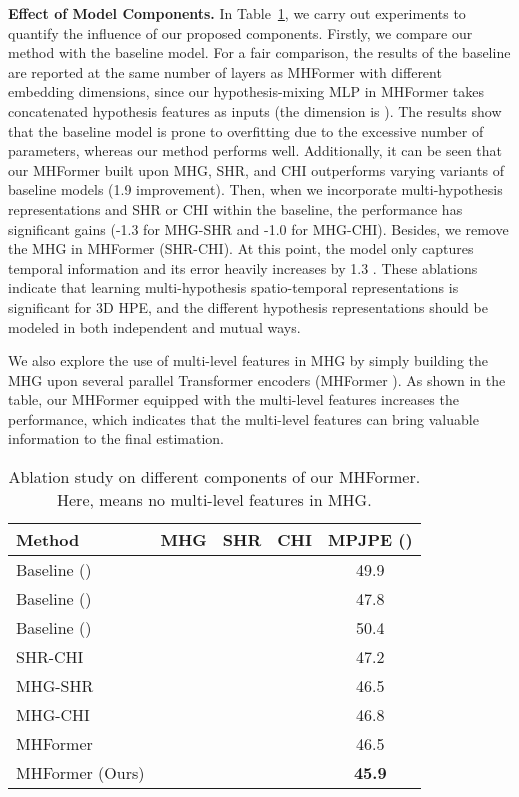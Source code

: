 \documentclass[10pt,twocolumn,letterpaper]{article}
\newcommand{\cmark}{\ding{51}}
\newcommand{\xmark}{\ding{55}}
\def\VspaceL{\vspace{-0.40cm}}
\begin{document}
\noindent
\textbf{Effect of Model Components.}
In Table~\ref{table:component}, we carry out experiments to quantify the influence of our proposed components. 
Firstly, we compare our method with the baseline model. 
For a fair comparison, the results of the baseline are reported at the same number of layers as MHFormer with different embedding dimensions, since our hypothesis-mixing MLP in MHFormer takes concatenated hypothesis features as inputs (the dimension is ).
The results show that the baseline model is prone to overfitting due to the excessive number of parameters, whereas our method performs well. 
Additionally, it can be seen that our MHFormer built upon MHG, SHR, and CHI outperforms varying variants of baseline models (1.9  improvement). 
Then, when we incorporate multi-hypothesis representations and SHR or CHI within the baseline, the performance has significant gains (-1.3  for MHG-SHR and -1.0  for MHG-CHI). 
Besides, we remove the MHG in MHFormer (SHR-CHI). 
At this point, the model only captures temporal information and its error heavily increases by 1.3 . 
These ablations indicate that learning multi-hypothesis spatio-temporal representations is significant for 3D HPE, and the different hypothesis representations should be modeled in both independent and mutual ways. 

We also explore the use of multi-level features in MHG by simply building the MHG upon several parallel Transformer encoders (MHFormer ). 
As shown in the table, our MHFormer equipped with the multi-level features increases the performance, which indicates that the multi-level features can bring valuable information to the final estimation. 

\begin{table}[t]
  \centering
  \footnotesize
  \caption
  {
    Ablation study on different components of our MHFormer. 
    Here,  means no multi-level features in MHG. 
  }
  \setlength{\tabcolsep}{2.50mm}
  \begin{tabular}{l|ccc|c}
  \toprule  [1pt]
  Method &MHG &SHR &CHI &MPJPE () \\
  \midrule [0.5pt]
  Baseline () &\xmark &\xmark &\xmark &49.9 \\
  Baseline () &\xmark &\xmark &\xmark &47.8 \\
  Baseline () &\xmark &\xmark &\xmark &50.4 \\
  \midrule [0.5pt]

  SHR-CHI &\xmark &\cmark &\cmark &47.2 \\
  MHG-SHR &\cmark &\cmark &\xmark  &46.5 \\
  MHG-CHI &\cmark &\xmark &\cmark &46.8 \\
  MHFormer  &\cmark &\cmark &\cmark &46.5 \\
  MHFormer (Ours) &\cmark &\cmark &\cmark &\textbf{45.9} \\
  \toprule [1pt]
  \end{tabular}
  \label{table:component}
  \VspaceL
\end{table}
\end{document}
